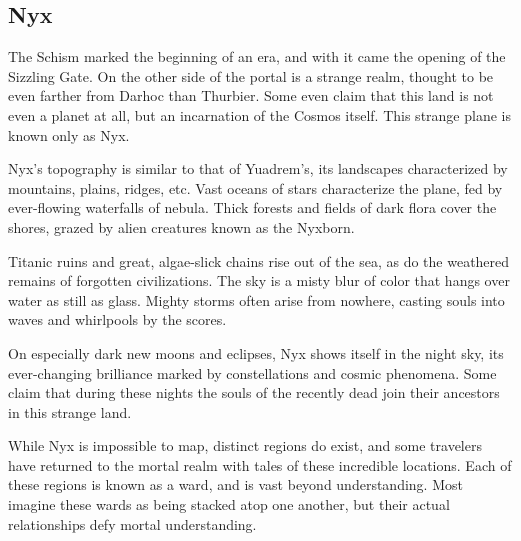 %

\subsection*{Nyx}
The Schism marked the beginning of an era, and with it came the opening of the Sizzling Gate.
On the other side of the portal is a strange realm, thought to be even farther from Darhoc than Thurbier.
Some even claim that this land is not even a planet at all, but an incarnation of the Cosmos itself.
This strange plane is known only as Nyx.

Nyx's topography is similar to that of Yuadrem's, its landscapes characterized by mountains, plains, ridges, etc.
Vast oceans of stars characterize the plane, fed by ever-flowing waterfalls of nebula.
Thick forests and fields of dark flora cover the shores, grazed by alien creatures known as the Nyxborn.

Titanic ruins and great, algae-slick chains rise out of the sea, as do the weathered remains of forgotten civilizations.
The sky is a misty blur of color that hangs over water as still as glass.
Mighty storms often arise from nowhere, casting souls into waves and whirlpools by the scores.

On especially dark new moons and eclipses, Nyx shows itself in the night sky, its ever-changing brilliance marked by constellations and cosmic phenomena.
Some claim that during these nights the souls of the recently dead join their ancestors in this strange land.

While Nyx is impossible to map, distinct regions do exist, and some travelers have returned to the mortal realm with tales of these incredible locations.
Each of these regions is known as a ward, and is vast beyond understanding.
Most imagine these wards as being stacked atop one another, but their actual relationships defy mortal understanding.

